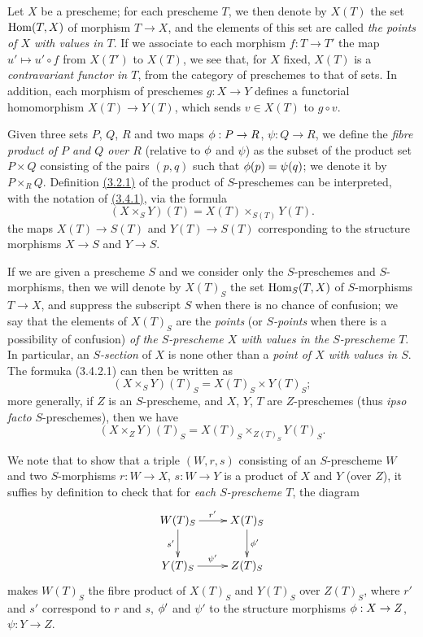 \begin{env}[3.4.1]
\label{env-1.3.4.1}
Let $X$ be a prescheme; for each prescheme $T$, we then denote by $X(T)$ the set
${\mathop{\mathrm{Hom}}\nolimits}(T,X)$ of morphism $T\to X$, and the elements of this set are called
{\it the points of $X$ with values in $T$}. If we associate to each morphism
$f:T\to T'$ the map $u'\mapsto u'\circ f$ from $X(T')$ to $X(T)$, we see that,
for $X$ fixed, $X(T)$ is a {\it contravariant functor in $T$}, from the
category of preschemes to that of sets. In addition, each morphism of preschemes
$g:X\to Y$ defines a functorial homomorphism $X(T)\to Y(T)$, which sends
$v\in X(T)$ to $g\circ v$.
\end{env}

\begin{env}[3.4.2]
\label{env-1.3.4.2}
Given three sets $P$, $Q$, $R$ and two maps $\phi:P\to R$, $\psi:Q\to R$, we define the
{\it fibre product of $P$ and $Q$ over $R$} (relative to $\phi$ and $\psi$) as the subset
of
the product set $P\times Q$ consisting of the pairs $(p,q)$ such that $\phi(p)=\psi(q)$; we
denote it by $P\times_R Q$. Definition \hyperref[defn-1.3.2.1]{(3.2.1)} of the product
of $S$-preschemes can be interpreted, with the notation of \hyperref[env-1.3.4.1]{(3.4.1)},
via the formula
\[
  (X\times_S Y)(T)=X(T)\times_{S(T)}Y(T).
  \tag{3.4.2.1}
\]
the maps $X(T)\to S(T)$ and $Y(T)\to S(T)$ corresponding to the structure morphisms
$X\to S$ and $Y\to S$.
\end{env}

\begin{env}[3.4.3]
\label{env-1.3.4.3}
If we are given a prescheme $S$ and we consider only the $S$-preschemes and $S$-morphisms,
then we will denote by $X(T)_S$ the set ${\mathop{\mathrm{Hom}}\nolimits}_S(T,X)$ of $S$-morphisms $T\to X$, and suppress
the subscript $S$ when there is no chance of confusion; we say that the elements of $X(T)_S$
are the {\it points} (or {\it $S$-points} when there is a possibility of confusion)
{\it of the $S$-prescheme $X$ with values in the $S$-prescheme $T$}. In particular, an
{\it $S$-section} of $X$ is none other than a {\it point of $X$ with values in $S$}. The
formuka (3.4.2.1) can then be written as
\[
  (X\times_S Y)(T)_S=X(T)_S\times Y(T)_S;
  \tag{3.4.3.1}
\]
more generally, if $Z$ is an $S$-prescheme, and $X$, $Y$, $T$ are $Z$-preschemes (thus
{\it ipso facto} $S$-preschemes), then we have
\[
  (X\times_Z Y)(T)_S=X(T)_S\times_{Z(T)_S}Y(T)_S.
  \tag{3.4.3.2}
\]

We note that to show that a triple $(W,r,s)$ consisting of an $S$-prescheme $W$ and two
$S$-morphisms $r:W\to X$, $s:W\to Y$ is a product of $X$ and $Y$ (over $Z$), it suffies by
definition to check that for {\it each $S$-prescheme $T$}, the diagram
\[
  \xymatrix{
    W(T)_S\ar[r]^{r'}\ar[d]_{s'} &
    X(T)_S\ar[d]^{\vphi'}\\
    Y(T)_S\ar[r]^{\psi'} &
    Z(T)_S
  }
\]
makes $W(T)_S$ the fibre product of $X(T)_S$ and $Y(T)_S$ over $Z(T)_S$, where $r'$ and $s'$
correspond to $r$ and $s$, $\phi'$ and $\psi'$ to the structure morphisms $\phi:X\to Z$,
$\psi:Y\to Z$.
\end{env}

